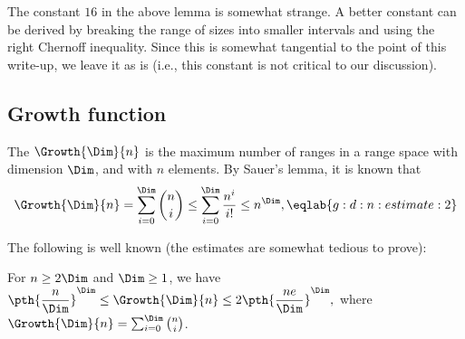 \begin{remark}
    The constant $16$ in the above lemma is somewhat strange. A better
    constant can be derived by breaking the range of sizes into
    smaller intervals and using the right Chernoff inequality. Since
    this is somewhat tangential to the point of this write-up, we
    leave it as is (i.e., this constant is not critical to our
    discussion).
\end{remark}



\subsection{Growth function}

The  $\Growth{\Dim}{n}$ is the maximum number
of ranges in a range space with \VC dimension $\Dim$, and with $n$
elements. By Sauer's lemma, it is known that 
\begin{equation}
    \Growth{\Dim}{n} = \sum_{i=0}^{\Dim} \binom{n}{i}
    \leq \sum_{i=0}^{\Dim} \frac{n^i}{i!}
    \leq n^\Dim,
    \eqlab{g:d:n:estimate:2}
\end{equation}

The following is well known (the estimates are somewhat
tedious to prove):
\begin{lemma}
    For $n \geq 2\Dim$ and $\Dim \geq 1$, we have
    \begin{math}
        \displaystyle \pth{\frac{n }{\Dim}}^\Dim%
        \leq%
        \Growth{\Dim}{n}%
        \leq%
        2 \pth{\frac{n e}{\Dim}}^\Dim,
    \end{math}
    where $\Growth{\Dim}{n} = \sum_{i=0}^{\Dim} \binom{n}{i}$.
\end{lemma}

\newcommand{\Net}{{\Sample}}%
\newcommand{\NetA}{{T}}%

